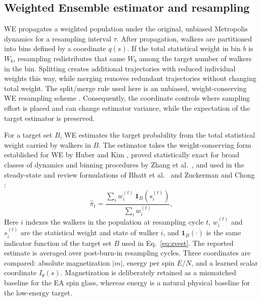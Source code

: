\documentclass[a4paper,fleqn]{cas-sc}
\begin{document}
\subsection{Weighted Ensemble estimator and resampling}\label{sec:we}
WE propagates a weighted population under the original, unbiased Metropolis dynamics for a
resampling interval $\tau$. After propagation, walkers are partitioned into bins defined by a
coordinate $q(s)$. If the total statistical weight in bin $b$ is $W_b$, resampling
redistributes that same $W_b$ among the target number of walkers in the bin. Splitting creates
additional trajectories with reduced individual weights this way, while merging removes
redundant trajectories without changing total weight. The split/merge rule used here is an unbiased, weight-conserving WE resampling scheme
\citep{zhang2010}. Consequently, the coordinate controls where sampling effort is placed and can
change estimator variance, while the expectation of the target estimator is preserved.

For a target set $B$, WE estimates the target probability from the total statistical weight
carried by walkers in $B$. The estimator takes the weight-conserving form established for WE
by Huber and Kim \citep{huber1996}, proved statistically exact for broad classes of dynamics
and binning procedures by Zhang et al.\ \citep{zhang2010}, and used in the steady-state and
review formulations of Bhatt et al.\ \citep{bhatt2010} and Zuckerman and Chong
\citep{zuckerman2017}:
\begin{equation}
\hat\pi_t=\frac{\sum_i w_i^{(t)}\,\mathbf 1_B\!\left(s_i^{(t)}\right)}{\sum_i w_i^{(t)}},
\label{eq:weest}
\end{equation}
Here $i$ indexes the walkers in the population at resampling cycle $t$, $w_i^{(t)}$ and
$s_i^{(t)}$ are the statistical weight and state of walker $i$, and $\mathbf 1_B(\cdot)$ is the
same indicator function of the target set $B$ used in Eq.~\eqref{eq:zvest}.
The reported estimate is averaged over post-burn-in resampling cycles. Three coordinates
are compared: absolute magnetization $|m|$, energy per spin $E/N$, and a learned scalar
coordinate $I_\theta(s)$. Magnetization is deliberately retained as a mismatched baseline for
the EA spin glass, whereas energy is a natural physical baseline for the low-energy target.
\end{document}

